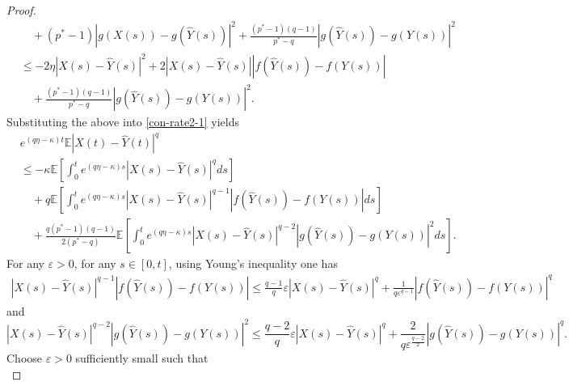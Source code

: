 \documentclass[preprint,12pt,compress]{elsarticle}
\begin{document}
\begin{proof}
\begin{equation*}
\begin{split}
	&\quad + (p^* - 1){\left| {g(X(s)) - g(\hat Y(s))} \right|^2} + \frac{{(p^* - 1)(q - 1)}}{{p^* - q}}{\left| {g(\hat Y(s)) - g(Y(s))} \right|^2} \\
	&\le -2\eta {\left| {X(s) - \hat Y(s)} \right|^2} + 2\left| {X(s) - \hat Y(s)} \right|\left| {f(\hat Y(s)) - f(Y(s))} \right| \\
	&\quad+ \frac{{(p^* - 1)(q - 1)}}{{p^* - q}}{\left| {g(\hat Y(s)) - g(Y(s))} \right|^2}.
\end{split}
\end{equation*}
Substituting the above into \eqref{con-rate2-1} yields
\begin{equation}  \label{ce4}
\begin{split}
	&{e^{\left( {q\eta  - \kappa } \right)t}}\mathbb{E}{\left| {X(t) - \hat Y(t)} \right|^q} \\
	&\le  - \kappa \mathbb{E}\left[ {\int_0^t {{e^{\left( {q\eta  - \kappa } \right)s}}{{\left| {X(s) - \hat Y(s)} \right|}^q}ds} } \right] \\
	&\quad+ q\mathbb{E}\left[ {\int_0^t {{e^{\left( {q\eta  - \kappa } \right)s}}{{\left| {X(s) - \hat Y(s)} \right|}^{q - 1}}\left| {f(\hat Y(s)) - f(Y(s))} \right|ds} } \right] \\
	&\quad+ \frac{{q({p^*} - 1)(q - 1)}}{{2({p^*} - q)}}\mathbb{E}\left[ {\int_0^t {{e^{\left( {q\eta  - \kappa } \right)s}}{{\left| {X(s) -\hat  Y(s)} \right|}^{q - 2}}{{\left| {g(\hat Y(s)) - g(Y(s))} \right|}^2}ds} } \right] .
\end{split}
\end{equation}
For any $\varepsilon > 0$, for any $s \in [0, t]$, using Young's inequality one has
\begin{equation}   \label{ce2}
\begin{split}
	{\left| {X(s) - \hat Y(s)} \right|^{q - 1}}\left| {f(\hat Y(s)) - f(Y(s))} \right| \le \frac{{q - 1}}{q}\varepsilon {\left| {X(s) - \hat Y(s)} \right|^q} + \frac{1}{{q{\varepsilon ^{q - 1}}}}{\left| {f(\hat Y(s)) - f(Y(s))} \right|^q}
\end{split}
\end{equation}
and 
\begin{equation} \label{ce3}
	{\left| {X(s) - \hat Y(s)} \right|^{q - 2}}{\left| {g(\hat Y(s)) - g(Y(s))} \right|^2} \le \frac{{q - 2}}{q}\varepsilon {\left| {X(s) - \hat Y(s)} \right|^q} + \frac{2}{{q{\varepsilon ^{\frac{{q - 2}}{2}}}}}{\left| {g(\hat Y(s)) - g(Y(s))} \right|^q} .
\end{equation}
Choose $\varepsilon > 0$ sufficiently small such that
\begin{equation}  \label{ce7}

\end{equation}
\end{proof}
\end{document}
